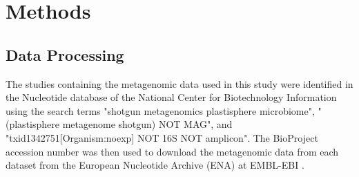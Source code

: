 \chapter{Methods}
% 
%



\section{Data Processing}
The studies containing the metagenomic data used in this study were identified in the Nucleotide database of the National Center for Biotechnology Information using the search terms "shotgun metagenomics plastisphere microbiome", "(plastisphere metagenome shotgun) NOT MAG", and "txid1342751[Organism:noexp] NOT 16S NOT amplicon". The BioProject accession number was then used to download the metagenomic data from each dataset from the European Nucleotide Archive (ENA) at EMBL-EBI \cite{embl-ebi2025ENABrowser}. 

